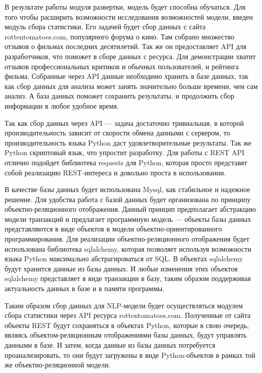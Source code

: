 В результате работы модуля развертки, модель будет способна обучаться. Для того чтобы расширить возможности исследования возможностей модели, введен модуль сбора статистики. Его задачей будет сбор данных с сайта rottentomatoes.com, популярного форума о кино. Там собрано множество отзывов о фильмах последних десятилетий. Так же он предоставляет API для разработчиков, что поможет в сборе данных с ресурса. Для демонстрации хватит отзывов профессиональных критиков и обычных пользователей, и рейтинга фильма. Собранные через API данные необходимо хранить в базе данных, так как сбор данных для анализа может занять значительно больше времени, чем сам анализ. А база данных поможет сохранить результаты, и продолжить сбор информации в любое удобное время.

Так как сбор данных через API --- задача достаточно тривиальная, в которой производительность зависит от скорости обмена данными с сервером, то производительность языка Python даст удовлетворительные результаты. Так же Python скриптовый язык, что упростит разработку. Для работы с REST API отлично подойдет библиотека requests для Python, которая просто представят собой реализацию REST-интереса и довольно проста в использовании.

В качестве базы данных будет использована Mysql, как стабильное и надежное решение. Для удобства работа с базой данных будет организована по принципу объектно-реляционного отображения. Данный принцип предполагает абстракцию модели транзакций и предлагает программную модель --- объекты базы данных представляются в виде объектов в модели объектно-ориентированного программирования. Для реализации объектно-реляционного отображения будет использована библиотека sqlalchemy, которая позволяет используя возможности языка Python максимально абстрагироваться от SQL\@. В объектах sqlalchemy будут хранится данные из базы данных. И любые изменения этих объектов sqlalchemy представляет в виде транзакции в базу, таким образом поддерживая актуальность данных в базе и в памяти программы.

Таким образом сбор данных для NLP-модели будет осуществляться модулем сбора статистики через API ресурса rottentomatoes.com. Полученные от сайта объекты REST будут сохраняться в объектах Python, которые в свою очередь, являясь объектом-реляционным отображениями базы данных, будут управлять данными в базе. И затем, когда данные из базы данных потребуется проанализировать, то они будут загружены в виде Python-объектов в рамках той же объектно-реляционной модели.

